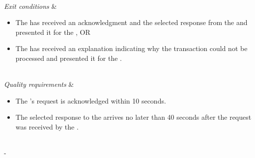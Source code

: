 \begin{table}[h!]
\begin{tabu}
\begin{itemize}[leftmargin=*,topsep=0pt,itemsep=-1ex]
	\end{itemize} \\
	\hline
	\textit{Exit conditions} &
	\vspace{-3mm}
	\begin{itemize}[leftmargin=*,topsep=0pt,itemsep=-1ex]
		\item The \client has received an acknowledgment and the selected response from the \server and presented it for the \researcher, OR
		\item The \client has received an explanation indicating why the transaction could not be processed and presented it for the \researcher.
	\end{itemize} \\
	\hline
	\textit{Quality \newline requirements} &
	\vspace{-3mm}
	\begin{itemize}[leftmargin=*,topsep=0pt,itemsep=-1ex]
		\item The \researcher's request is acknowledged within 10 seconds.
		\item The selected response to the \client arrives no later than 40 seconds after the request was received by the \server.
	\end{itemize} \\
	\tabucline[1.5pt]-
\end{tabu}
\caption{Use case: ExportProtocol}
\label{uc:ExportProtocol}
\end{table}